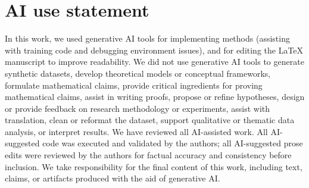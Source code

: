 \section{AI use statement}

In this work, we used generative AI tools for implementing methods (assisting with training code and debugging environment issues), and for editing the LaTeX manuscript to improve readability. We did not use generative AI tools to generate synthetic datasets, develop theoretical models or conceptual frameworks, formulate mathematical claims, provide critical ingredients for proving mathematical claims, assist in writing proofs, propose or refine hypotheses, design or provide feedback on research methodology or experiments, assist with translation, clean or reformat the dataset, support qualitative or thematic data analysis, or interpret results. We have reviewed all AI-assisted work. All AI-suggested code was executed and validated by the authors; all AI-suggested prose edits were reviewed by the authors for factual accuracy and consistency before inclusion. We take responsibility for the final content of this work, including text, claims, or artifacts produced with the aid of generative AI.